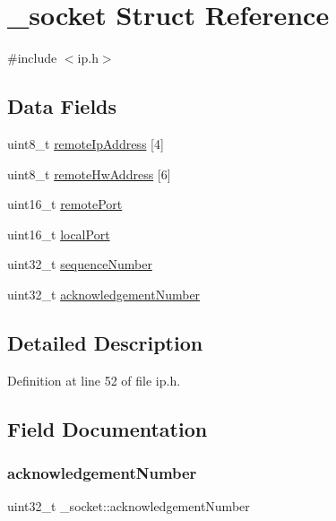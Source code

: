 \hypertarget{struct__socket}{}\section{\+\_\+socket Struct Reference}
\label{struct__socket}


{\ttfamily \#include $<$ip.\+h$>$}

\subsection*{Data Fields}
\begin{DoxyCompactItemize}
\item 
uint8\+\_\+t \hyperlink{struct__socket_ae438161156389061a3308dd497f2b09f}{remote\+Ip\+Address} \mbox{[}4\mbox{]}
\item 
uint8\+\_\+t \hyperlink{struct__socket_a311f2b383d551ded4600d615c694b017}{remote\+Hw\+Address} \mbox{[}6\mbox{]}
\item 
uint16\+\_\+t \hyperlink{struct__socket_a935bf244e1d1690304b3f458b2027c22}{remote\+Port}
\item 
uint16\+\_\+t \hyperlink{struct__socket_ad983682309ef0025642a48f6aa333524}{local\+Port}
\item 
uint32\+\_\+t \hyperlink{struct__socket_a2f8ccd3dae23cc49d1a81bbcbba14ef5}{sequence\+Number}
\item 
uint32\+\_\+t \hyperlink{struct__socket_a8ccfcadbddb377faf81d9a8e9a72e58f}{acknowledgement\+Number}
\end{DoxyCompactItemize}


\subsection{Detailed Description}


Definition at line 52 of file ip.\+h.



\subsection{Field Documentation}
\mbox{\label{struct__socket_a8ccfcadbddb377faf81d9a8e9a72e58f}} 
\subsubsection{\texorpdfstring{acknowledgement\+Number}{acknowledgementNumber}}
{\footnotesize\ttfamily uint32\+\_\+t \+\_\+socket\+::acknowledgement\+Number}




